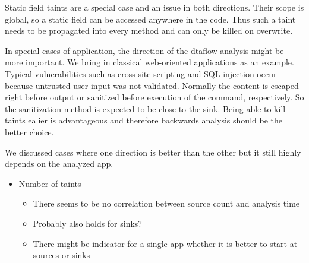\documentclass[../draft.tex]{subfiles}
\begin{document}
    Static field taints are a special case and an issue in both directions. Their scope is global, so a static field can be accessed anywhere in the code. Thus such a taint needs to be propagated into every method and can only be killed on overwrite.

    In special cases of application, the direction of the dtaflow analysis might be more important. We bring in classical web-oriented applications as an example. Typical vulnerabilities such as cross-site-scripting and SQL injection occur because untrusted user input was not validated. Normally the content is escaped right before output or sanitized before execution of the command, respectively. So the sanitization method is expected to be close to the sink. Being able to kill taints ealier is advantageous and therefore backwards analysis should be the better choice.

    We discussed cases where one direction is better than the other but it still highly depends on the analyzed app.  

    \begin{itemize}
        \item Number of taints
        \begin{itemize}
            \item There seems to be no correlation between source count and analysis time
            \item Probably also holds for sinks?
            \item There might be indicator for a single app whether it is better to start at sources or sinks
        \end{itemize}
    \end{itemize}
\end{document}
